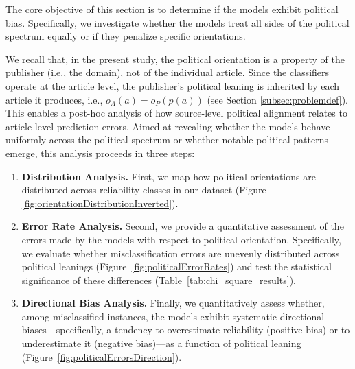 \documentclass[journal]{IEEEtran}
\begin{document}
The core objective of this section is to determine if the models exhibit political bias. Specifically, we investigate whether the models treat all sides of the political spectrum equally or if they penalize specific orientations.

We recall that, in the present study, the political orientation is a property of the publisher (i.e., the domain), not of the individual article.
Since the classifiers operate at the article level, the publisher’s political leaning is inherited by each article it produces, i.e., \(o_A(a) = o_P(p(a))\) (see Section \ref{subsec:problemdef}). This enables a post-hoc analysis of how source-level political alignment relates to article-level prediction errors.
Aimed at revealing whether the models behave uniformly across the political spectrum or whether notable political patterns emerge, this analysis proceeds in three steps:

\begin{enumerate}
    \item \textbf{Distribution Analysis.} First, we map how political orientations are distributed across reliability classes in our dataset (Figure \ref{fig:orientationDistributionInverted}).

    \item \textbf{Error Rate Analysis.} Second, we provide a quantitative assessment of the errors made by the models with respect to political orientation. Specifically, we evaluate whether misclassification errors are unevenly distributed across political leanings (Figure~\ref{fig:politicalErrorRates}) and test the statistical significance of these differences (Table~\ref{tab:chi_square_results}).

    \item \textbf{Directional Bias Analysis.} Finally, we quantitatively assess whether, among misclassified instances, the models exhibit systematic directional biases—specifically, a tendency to overestimate reliability (positive bias) or to underestimate it (negative bias)—as a function of political leaning (Figure~\ref{fig:politicalErrorsDirection}).
\end{enumerate}
\end{document}
